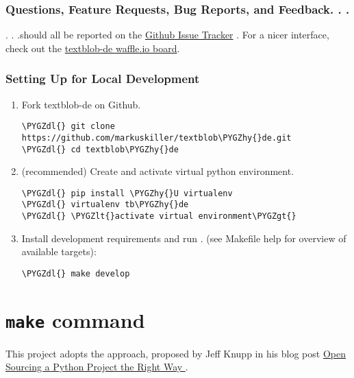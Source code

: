 \documentclass[letterpaper,10pt,english]{sphinxmanual}
\def\PYGZlt{\char`\<}
\def\PYGZgt{\char`\>}
\def\PYGZdl{\char`\$}
\def\PYGZhy{\char`\-}
\begin{document}
\subsubsection{Questions, Feature Requests, Bug Reports, and Feedback. . .}
\label{contributing:questions-feature-requests-bug-reports-and-feedback}
. . .should all be reported on the \href{https://github.com/markuskiller/textblob-de/issues?state=open}{Github Issue Tracker} . For a nicer interface, check out the \href{https://waffle.io/markuskiller/textblob-de}{textblob-de waffle.io board}.


\subsubsection{Setting Up for Local Development}
\label{contributing:github-issue-tracker}\label{contributing:setting-up-for-local-development}\begin{enumerate}
\item {} 
Fork textblob-de on Github.

\begin{Verbatim}[commandchars=\\\{\}]
\PYGZdl{} git clone https://github.com/markuskiller/textblob\PYGZhy{}de.git
\PYGZdl{} cd textblob\PYGZhy{}de
\end{Verbatim}

\item {} 
(recommended) Create and activate virtual python environment.

\begin{Verbatim}[commandchars=\\\{\}]
\PYGZdl{} pip install \PYGZhy{}U virtualenv
\PYGZdl{} virtualenv tb\PYGZhy{}de
\PYGZdl{} \PYGZlt{}activate virtual environment\PYGZgt{}
\end{Verbatim}

\item {} 
Install development requirements and run .
(see Makefile help for overview of available
 targets):

\begin{Verbatim}[commandchars=\\\{\}]
\PYGZdl{} make develop
\end{Verbatim}

\end{enumerate}


\section{\texttt{make} command}
\label{make_info:make-command}\label{make_info::doc}
This project adopts the  approach, proposed by Jeff Knupp in his
blog post \href{http://www.jeffknupp.com/blog/2013/08/16/open-sourcing-a-python-project-the-right-way/}{Open Sourcing a Python Project the Right Way }.
\end{document}
